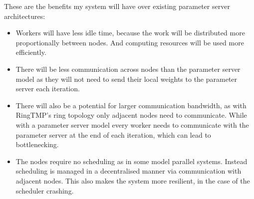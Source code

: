 These are the benefits my system will have over existing parameter server
architectures:
\begin{itemize}

    \item Workers will have less idle time, because the work will be distributed
    more proportionally between nodes. And computing resources will be used more
    efficiently.
    \item There will be less communication across nodes than the parameter
    server model as they will not need to send their local weights to the
    parameter server each iteration.
    \item There will also be a potential for larger communication bandwidth, as
    with RingTMP's ring topology only adjacent nodes need to communicate. While
    with a parameter server model every worker needs to communicate with the
    parameter server at the end of each iteration, which can lead to
    bottlenecking.
    \item The nodes require no scheduling as in some model parallel systems.
    Instead scheduling is managed in a decentralised manner via communication
    with adjacent nodes. This also makes the system more resilient, in the case
    of the scheduler crashing.
\end{itemize}

